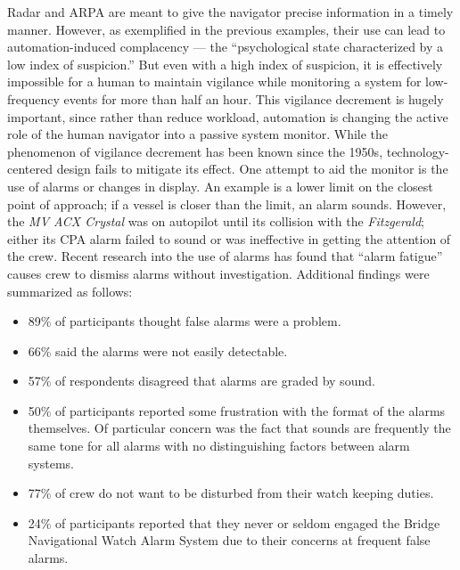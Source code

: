 \documentclass[twoside,symmetric,notoc]{tufte-book}
\begin{document}
\par{%
Radar and ARPA are meant to give the navigator precise information in a timely manner. However, as exemplified in the previous examples, their use can lead to automation-induced complacency --- the ``psychological state characterized by a low index of suspicion.''\cite{Wiener} But even with a high index of suspicion, it is effectively impossible for a human to maintain vigilance while monitoring a system for low-frequency events for more than half an hour. This vigilance decrement is hugely important, since rather than reduce workload, automation is changing the active role of the human navigator into a passive system monitor. While the phenomenon of vigilance decrement has been known since the 1950s, technology-centered design fails to mitigate its effect. One attempt to aid the monitor is the use of alarms or changes in display.\cite{Parasuraman} An example is a lower limit on the closest point of approach; if a vessel is closer than the limit, an alarm sounds. However, the \textit{MV ACX Crystal} was on autopilot until its collision with the \textit{Fitzgerald}; either its CPA alarm failed to sound or was ineffective in getting the attention of the crew. Recent research into the use of alarms has found that ``alarm fatigue'' causes crew to dismiss alarms without investigation.\cite{Shipowners_club} Additional findings were summarized as follows:
\begin{itemize}
    \item 89\% of participants thought false alarms were a problem.
    \item 66\% said the alarms were not easily detectable.
    \item 57\% of respondents disagreed that alarms are graded by sound.
    \item 50\% of participants reported some frustration with the format of the alarms themselves. Of particular concern was the fact that sounds are frequently the same tone for all alarms with no distinguishing factors between alarm systems.
    \item 77\% of crew do not want to be disturbed from their watch keeping duties.
    \item 24\% of participants reported that they never or seldom engaged the Bridge Navigational Watch Alarm System due to their concerns at frequent false alarms.
\end{itemize}
}
\end{document}
